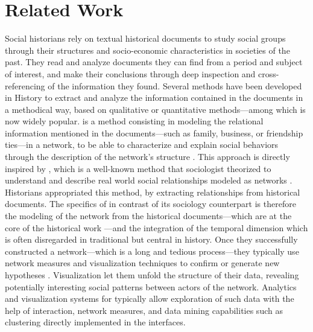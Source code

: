 
\chapter{Related Work}\label{ch:related-work}


Social historians rely on textual historical documents to study social groups through their structures and socio-economic characteristics in societies of the past\cite{tilly1984retrieving}.
They read and analyze documents they can find from a period and subject of interest, and make their conclusions through deep inspection and cross-referencing of the information they found.
Several methods have been developed in History to extract and analyze the information contained in the documents in a methodical way\cite{tillyObservationsSocialProcesses2004}, based on qualitative or quantitative methods---among which \hsna is now widely popular\cite{rollingerProlegomenaProblemsPerspectives2020}.
\hsna is a method consisting in modeling the relational information mentioned in the documents---such as family, business, or friendship ties---in a network, to be able to characterize and explain social behaviors through the description of the network's structure \cite{wetherellHistoricalSocialNetwork1998, kerschbaumerPowerNetworksProspects2015}.
This approach is directly inspired by \sna, which is a well-known method that sociologist theorized to understand and describe real world social relationships modeled as networks \cite{freemanDevelopmentSocialNetwork2004, scottSocialNetworkAnalysis1988}.
Historians appropriated this method, by extracting relationships from historical documents.
The specifics of \hsna in contrast of its sociology counterpart is therefore the modeling of the network from the historical documents---which are at the core of the historical work \cite{prost2014}---and the integration of the temporal dimension which is often disregarded in traditional \sna but central in history.
Once they successfully constructed a network---which is a long and tedious process---they typically use network measures and visualization techniques to confirm or generate new hypotheses \cite{lemercier12FormalNetwork2015}.
Visualization let them unfold the structure of their data, revealing potentially interesting social patterns between actors of the network.
Analytics and visualization systems for \sna typically allow exploration of such data with the help of interaction, network measures, and data mining capabilities such as clustering directly implemented in the interfaces.
